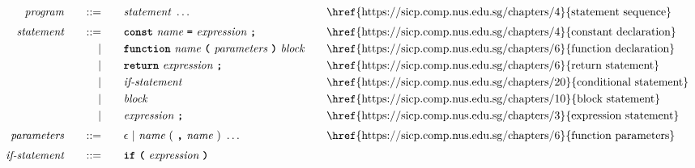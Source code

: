 \begin{alignat*}{9}
&& \textit{program}    &&\quad ::= &\quad && \textit{statement} \ \ldots
                                                           && \textrm{\href{https://sicp.comp.nus.edu.sg/chapters/4}{statement sequence}} \\[1mm]
&& \textit{statement}    &&\quad ::= &\quad && \textbf{\texttt{const}}\  \textit{name} \ 
                                           \textbf{\texttt{=}}\  \textit{expression} \ \textbf{\texttt{;}}
                                                           && \textrm{\href{https://sicp.comp.nus.edu.sg/chapters/4}{constant declaration}} \\
&&                       && |   &\quad && \textbf{\texttt{function}}\  \textit{name} \ 
                                   \textbf{\texttt{(}}\  \textit{parameters} \ \textbf{\texttt{)}}\ \textit{block} \quad
                                                           && \textrm{\href{https://sicp.comp.nus.edu.sg/chapters/6}{function declaration}}\\
&&                       && |   &\quad && \textbf{\texttt{return}}\  \textit{expression} \ \textbf{\texttt{;}}
                                                           && \textrm{\href{https://sicp.comp.nus.edu.sg/chapters/6}{return statement}}\\
&&                       && |   &\quad && \textit{if-statement} \quad
                                                           && \textrm{\href{https://sicp.comp.nus.edu.sg/chapters/20}{conditional statement}}\\
&&                       && |   &\quad &&  \textit{block} 
                                                           && \textrm{\href{https://sicp.comp.nus.edu.sg/chapters/10}{block statement}}\\
&&                       && |   &\quad &&  \textit{expression} \ \textbf{\texttt{;}}
                                                           && \textrm{\href{https://sicp.comp.nus.edu.sg/chapters/3}{expression statement}} \\[1mm]
&& \textit{parameters}   && ::= &\quad &&  \epsilon\ | \  \textit{name} \ 
                                                   (\ \textbf{\texttt{,}} \ \textit{name}\ )\ \ldots
                                                            && \textrm{\href{https://sicp.comp.nus.edu.sg/chapters/6}{function parameters}}   \\[1mm]
&& \textit{if-statement} && ::= &\quad &&  \textbf{\texttt{if}}\
                                   \textbf{\texttt{(}}\ \textit{expression} \ \textbf{\texttt{)}}\ 

\end{alignat*}
